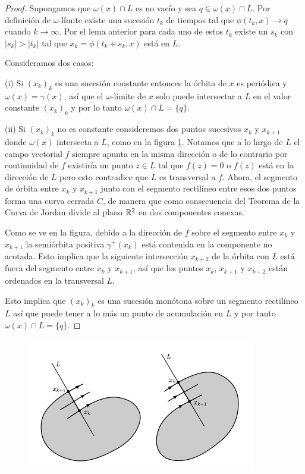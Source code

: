 \begin{proof}
Supongamos que $\omega(x) \cap L$ es no vacío y sea $q \in \omega(x) \cap L$. Por definición de $\omega$-límite existe una sucesión $t_k$ de tiempos tal que $\phi(t_k, x) \to q$ cuando $k \to \infty$. Por el lema anterior para cada uno de estos $t_k$ existe un $s_k$ con $|s_k| > |t_k|$ tal que $x_k = \phi(t_k + s_k, x)$ está en $L$.

Consideramos dos casos:

(i) Si $(x_k)_k$ es una sucesión constante entonces la órbita de $x$ es periódica y $\omega(x) = \gamma(x)$, así que el $\omega$-límite de $x$ solo puede intersectar a $L$ en el valor constante $(x_k)_k$ y por lo tanto $\omega(x) \cap L = \{q\}$.

(ii) Si $(x_k)_k$ no es constante consideremos dos puntos sucesivos $x_k$ y $x_{k+1}$ donde $\omega(x)$ intersecta a $L$, como en la figura \ref{fig:transversalintersections}. Notamos que a lo largo de $L$ el campo vectorial $f$ siempre apunta en la misma dirección o de lo contrario por continuidad de $f$ existiría un punto $z \in L$ tal que $f(z) = 0$ o $f(z)$ está en la dirección de $L$ pero esto contradice que $L$ es transversal a $f$.
Ahora, el segmento de órbita entre $x_k$ y $x_{k+1}$ junto con el segmento rectilíneo entre esos dos puntos forma una curva cerrada $C$, de manera que como consecuencia del Teorema de la Curva de Jordan divide al plano ${\mathbb{R}}^2$ en dos componentes conexas.

Como se ve en la figura, debido a la dirección de $f$ sobre el segmento entre $x_k$ y $x_{k+1}$ la semiórbita positiva $\gamma^+(x_k)$ está contenida en la componente no acotada. Esto implica que la siguiente intersección $x_{k+2}$ de la órbita con $L$ está fuera del segmento entre $x_k$ y $x_{k+1}$, así que los puntos $x_k$, $x_{k+1}$ y $x_{k+2}$ están ordenados en la transversal $L$.

Esto implica que $(x_k)_k$ es una sucesión monótona sobre un segmento rectilíneo $L$ así que puede tener a lo más un punto de acumulación en $L$ y por tanto $\omega(x) \cap L = \{q\}$.

\end{proof}

\begin{figure}[h] \centering
    \includegraphics[scale=0.8]{figures/transversal-intersections.png}
	\label{fig:transversalintersections}
\end{figure}

